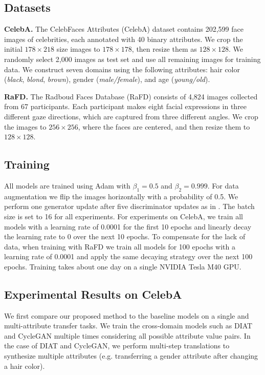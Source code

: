\documentclass[10pt,twocolumn,letterpaper]{article}
\begin{document}
\medskip

\subsection{Datasets}
\noindent \textbf{CelebA.} The CelebFaces Attributes (CelebA) dataset \cite{liu2015faceattributes} contains 202,599 face images of celebrities, each annotated with 40 binary attributes. We crop the initial $178 \times 218$ size images to $178 \times 178$, then resize them as $128 \times 128$. We randomly select 2,000 images as test set and use all remaining images for training data. We construct seven domains using the following attributes: hair color (\textit{black}, \textit{blond}, \textit{brown}), gender (\textit{male/female}), and age (\textit{young/old}). 

\medskip

\noindent \textbf{RaFD.} The Radboud Faces Database (RaFD) \cite{langner2010presentation} consists of 4,824 images collected from 67 participants. Each participant makes eight facial expressions in three different gaze directions, which are captured from three different angles. We crop the images to $256 \times 256$,  where the faces are centered, and then resize them to $128 \times 128$. 

\medskip

\subsection{Training}
All models are trained using Adam \cite{kingma2014adam} with ${\beta}_{1}=0.5$ and ${\beta}_{2}=0.999$. For data augmentation we flip the images horizontally with a probability of 0.5. We perform one generator update after five discriminator updates as in \cite{gulrajani2017improved}. The batch size is set to 16 for all experiments. For experiments on CelebA,  we train all models with a learning rate of 0.0001 for the first 10 epochs and linearly decay the learning rate to 0 over the next 10 epochs. To compensate for the lack of data, when training with RaFD we train all models for 100 epochs with a learning rate of 0.0001 and apply the same decaying strategy over the next 100 epochs. Training takes about one day on a single NVIDIA Tesla M40 GPU. 

\subsection{Experimental Results on CelebA}
We first compare our proposed method to the baseline models on a single and multi-attribute transfer tasks. We train the cross-domain models such as DIAT and CycleGAN multiple times considering all possible attribute value pairs. 
In the case of DIAT and CycleGAN, we perform multi-step translations to synthesize multiple attributes (e.g. transferring a gender attribute after changing a hair color).
\medskip
\end{document}
